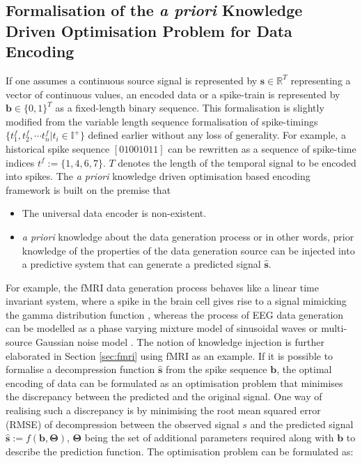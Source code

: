 \subsection{Formalisation of the \emph{a priori} Knowledge Driven Optimisation Problem for Data Encoding}
If one assumes a continuous source signal is represented by $ \mathbf{s}\in \mathbb{R}^T$ representing a vector of continuous values, an encoded data or a spike-train is represented by $\mathbf{b}\in \{0, 1\}^T$ as a fixed-length binary sequence. This formalisation is slightly modified from the variable length sequence formalisation of spike-timings $\{t_1^f, t_2^f,\cdots t_n^f|t_i\in \mathbb{I}^+\}$ defined earlier without any loss of generality. For example, a historical spike sequence $[01001011]$ can be rewritten as a sequence of spike-time indices $t^f :=\{1, 4, 6, 7\}$. $T$ denotes the length of the temporal signal to be encoded into spikes. The \emph{a priori} knowledge driven optimisation based encoding framework is built on the premise that 
\begin{itemize}
	\item The universal data encoder is non-existent.
	\item \emph{a priori} knowledge about the data generation process or in other words, prior knowledge of the properties of the data generation source can be injected into a predictive system that can generate a predicted signal $\mathbf{\hat{s}}$. 
\end{itemize}
For example, the fMRI data generation process behaves like a linear time invariant system, where a spike in the brain cell gives rise to a signal mimicking the gamma distribution function \citep{ashby2011statistical}, whereas the process of EEG data generation can be modelled as a phase varying mixture model of sinusoidal waves or multi-source Gaussian noise model \citep{nunezm2016eeg}. The notion of knowledge injection is further elaborated in Section \ref{sec:fmri} using fMRI as an example. If it is possible to formalise a decompression function $\mathbf{\hat{s}}$ from the spike sequence $\mathbf{b}$, the optimal encoding of data can be formulated as an optimisation problem that minimises the discrepancy between the predicted and the original signal. One way of realising such a discrepancy is by minimising the root mean squared error (RMSE) of decompression between the observed signal $s$ and the predicted signal $\mathbf{\hat{s}}:=f(\mathbf{b}, \mathbf{\Theta})$, $\mathbf{\Theta}$ being the set of additional parameters required along with $\mathbf{b}$ to describe the prediction function. The optimisation problem can be formulated as:
